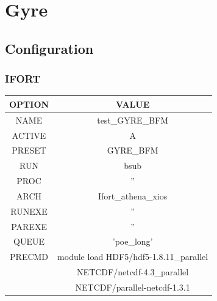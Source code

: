 \section{Gyre}\label{sec:gyre}
\subsection{Configuration}
\subsubsection{IFORT}
\begin{tabular}{|c|c|}
\hline
\hline
\rowcolor{LightCyan}
{\bf OPTION}   & {\bf VALUE} \\
\hline    
NAME     & test\_GYRE\_BFM \\                                                                       
\hline                                                                                              
ACTIVE   & A \\
\hline                                                                                              
PRESET   & GYRE\_BFM \\
\hline                                                                                               
RUN      & bsub \\
\hline                                                                                               
PROC     & '' \\
\hline                                                                                            
ARCH     & Ifort\_athena\_xios \\
\hline                                                                                            
RUNEXE   & '' \\
\hline                                                                                            
PAREXE   & '' \\
\hline                                                                                            
QUEUE    & 'poe\_long' \\
\hline                                                                                            
PRECMD   & module load HDF5/hdf5-1.8.11\_parallel \\
         & NETCDF/netcdf-4.3\_parallel \\
         & NETCDF/parallel-netcdf-1.3.1 \\
\hline                                                                                            

\end{tabular}
